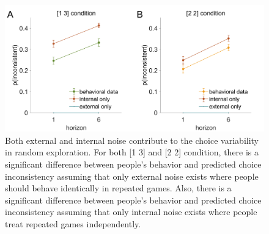 \documentclass[12pt]{article}
\begin{document}
	\begin{figure}[H]
		\begin{center}
			\includegraphics[width=\textwidth]{figures/theory_da_info.png}
			\caption[Both external and internal noise contribute to the choice variability in random exploration]{Both external and internal noise contribute to the choice variability in random exploration. For both [1 3] and [2 2] condition, there is a significant difference between people's behavior and predicted choice inconsistency assuming that only external noise exists where people should behave identically in repeated games. Also, there is a significant difference between people's behavior and predicted choice inconsistency assuming that only internal noise exists where people treat repeated games independently. }
			\label{fig:mf22}
		\end{center}
	\end{figure}
	\newpage
\end{document}
